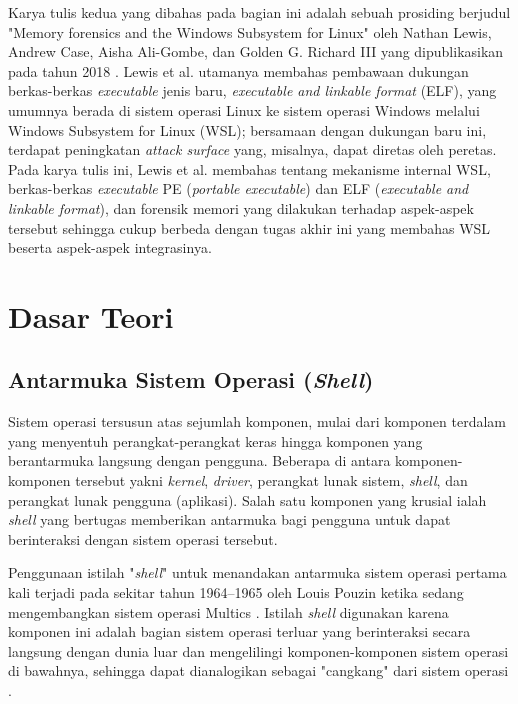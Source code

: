 Karya tulis kedua yang dibahas pada bagian ini adalah sebuah prosiding berjudul "Memory forensics and the Windows Subsystem for Linux" oleh Nathan Lewis, Andrew Case, Aisha Ali-Gombe, dan Golden G. Richard III yang dipublikasikan pada tahun 2018 \cite{lewis2018memory}. Lewis et al. utamanya membahas pembawaan dukungan berkas-berkas \textit{executable} jenis baru, \textit{executable and linkable format} (ELF), yang umumnya berada di sistem operasi Linux ke sistem operasi Windows melalui Windows Subsystem for Linux (WSL); bersamaan dengan dukungan baru ini, terdapat peningkatan \textit{attack surface} yang, misalnya, dapat diretas oleh peretas. Pada karya tulis ini, Lewis et al. membahas tentang mekanisme internal WSL, berkas-berkas \textit{executable} PE (\textit{portable executable}) dan ELF (\textit{executable and linkable format}), dan forensik memori yang dilakukan terhadap aspek-aspek tersebut sehingga cukup berbeda dengan tugas akhir ini yang membahas WSL beserta aspek-aspek integrasinya.

\section{Dasar Teori}

\subsection{Antarmuka Sistem Operasi (\textit{Shell})}

Sistem operasi tersusun atas sejumlah komponen, mulai dari komponen terdalam yang menyentuh perangkat-perangkat keras hingga komponen yang berantarmuka langsung dengan pengguna. Beberapa di antara komponen-komponen tersebut yakni \textit{kernel}, \textit{driver}, perangkat lunak sistem, \textit{shell}, dan perangkat lunak pengguna (aplikasi). Salah satu komponen yang krusial ialah \textit{shell} yang bertugas memberikan antarmuka bagi pengguna untuk dapat berinteraksi dengan sistem operasi tersebut.

Penggunaan istilah "\textit{shell}" untuk menandakan antarmuka sistem operasi pertama kali terjadi pada sekitar tahun 1964--1965 oleh Louis Pouzin ketika sedang mengembangkan sistem operasi Multics \cite{origin-of-the-shell-name}. Istilah \textit{shell} digunakan karena komponen ini adalah bagian sistem operasi terluar yang berinteraksi secara langsung dengan dunia luar dan mengelilingi komponen-komponen sistem operasi di bawahnya, sehingga dapat dianalogikan sebagai "cangkang" dari sistem operasi \cite{shell-jargon-explanation}.

